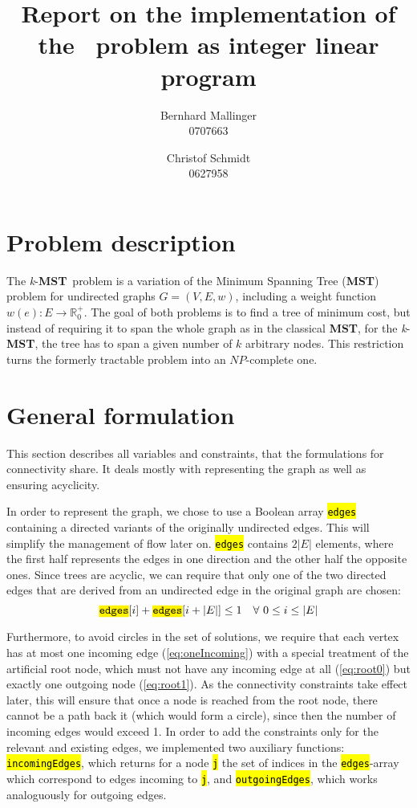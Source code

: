 \documentclass[,%
			paper=a4,%
			DIV12,
			liststotoc,
			bibtotoc,
			draft=false,%
			numbers=noendperiod
			]{scrartcl}
\title{Report on the implementation of the \kmst\ problem as integer linear program}
\author{Bernhard Mallinger \\ 0707663 \and Christof Schmidt \\ 0627958}
\newcommand{\mst}{\textbf{MST}}
\newcommand{\kmst}{\textit{k}-\mst}
\newcommand{\ilc}[1]{\hl{\texttt{#1}}} %
\begin{document}
\maketitle

\section{Problem description}

The \kmst\ problem is a variation of the Minimum Spanning Tree (\mst) problem for undirected graphs $G = (V, E, w)$, including a weight function $w(e) : E \rightarrow \mathbb{R}^+_0$.
The goal of both problems is to find a tree of minimum cost, but instead of requiring it to span the whole graph as in the classical \mst, for the \kmst, the tree has to span a given number of $k$ arbitrary nodes.
This restriction turns the formerly tractable problem into an $NP$-complete one.

\section{General formulation}

This section describes all variables and constraints, that the formulations for connectivity share. It deals mostly with representing the graph as well as ensuring acyclicity.

In order to represent the graph, we chose to use a Boolean array \ilc{edges} containing a directed variants of the originally undirected edges.
This will simplify the management of flow later on.
\ilc{edges} contains $2|E|$ elements, where the first half represents the edges in one direction and the other half the opposite ones.
Since trees are acyclic, we can require that only one of the two directed edges that are derived from an undirected edge in the original graph are chosen:
\begin{equation}
 \ilc{edges}[i] + \ilc{edges}[i + |E|] \leq 1\quad\forall~0\leq i \leq |E|
\end{equation}

Furthermore, to avoid circles in the set of solutions, we require that each vertex has at most one incoming edge (\eqref{eq:oneIncoming}) with a special treatment of the artificial root node, which must not have any incoming edge at all (\eqref{eq:root0}) but exactly one outgoing node (\eqref{eq:root1}). 
As the connectivity constraints take effect later, this will ensure that once a node is reached from the root node, there cannot be a path back it (which would form a circle), since then the number of incoming edges would exceed 1.
In order to add the constraints only for the relevant and existing edges, we implemented two auxiliary functions: \ilc{incomingEdges}, which returns for a node \ilc{j} the set of indices in the \ilc{edges}-array which correspond to edges incoming to \ilc{j}, and \ilc{outgoingEdges}, which works analoguously for outgoing edges.
\end{document}
